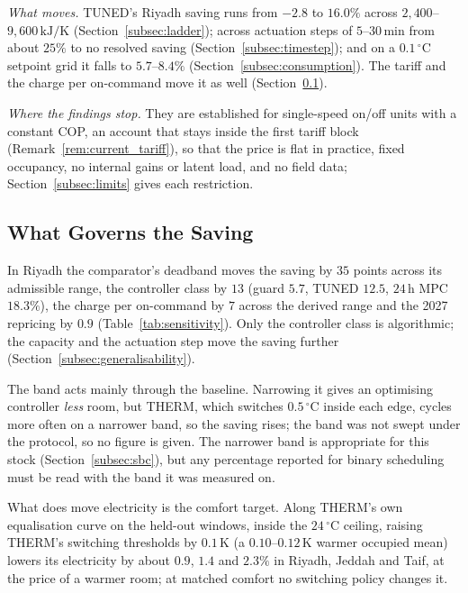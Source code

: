 \documentclass[pdflatex,sn-mathphys-num,iicol]{sn-jnl}
\theoremstyle{thmstyleone}\newtheorem{proposition}{Proposition}\newtheorem{corollary}{Corollary}
\theoremstyle{thmstyletwo}\newtheorem{remark}{Remark}\newtheorem{observation}{Observation}
\theoremstyle{thmstylethree}\newtheorem{definition}{Definition}
\begin{document}
\emph{What moves.} TUNED's Riyadh saving runs from $-2.8$ to $16.0\%$ across $2{,}400$--$9{,}600\,\text{kJ/K}$ (Section~\ref{subsec:ladder}); across actuation steps of $5$--$30\,$min from about $25\%$ to no resolved saving (Section~\ref{subsec:timestep}); and on a $0.1\,^\circ$C setpoint grid it falls to $5.7$--$8.4\%$ (Section~\ref{subsec:consumption}). The tariff and the charge per on-command move it as well (Section~\ref{subsec:disc_band}).

\emph{Where the findings stop.} They are established for single-speed on/off units with a constant COP, an account that stays inside the first tariff block (Remark~\ref{rem:current_tariff}), so that the price is flat in practice, fixed occupancy, no internal gains or latent load, and no field data; Section~\ref{subsec:limits} gives each restriction.

\subsection{What Governs the Saving}
\label{subsec:disc_band}
\label{subsec:disc_tariff}
\label{subsec:disc_modele}

In Riyadh the comparator's deadband moves the saving by $35$ points across its admissible range, the controller class by $13$ (guard $5.7$, TUNED $12.5$, $24\,$h MPC $18.3\%$), the charge per on-command by $7$ across the derived range and the 2027 repricing by $0.9$ (Table~\ref{tab:sensitivity}). Only the controller class is algorithmic; the capacity and the actuation step move the saving further (Section~\ref{subsec:generalisability}).

The band acts mainly through the baseline. Narrowing it gives an optimising controller \emph{less} room, but THERM, which switches $0.5\,^\circ$C inside each edge, cycles more often on a narrower band, so the saving rises; the band was not swept under the protocol, so no figure is given. The narrower band is appropriate for this stock (Section~\ref{subsec:sbc}), but any percentage reported for binary scheduling must be read with the band it was measured on.

What does move electricity is the comfort target. Along THERM's own equalisation curve on the held-out windows, inside the $24\,^\circ$C ceiling, raising THERM's switching thresholds by $0.1\,$K (a $0.10$--$0.12\,$K warmer occupied mean) lowers its electricity by about $0.9$, $1.4$ and $2.3\%$ in Riyadh, Jeddah and Taif, at the price of a warmer room; at matched comfort no switching policy changes it.
\end{document}
